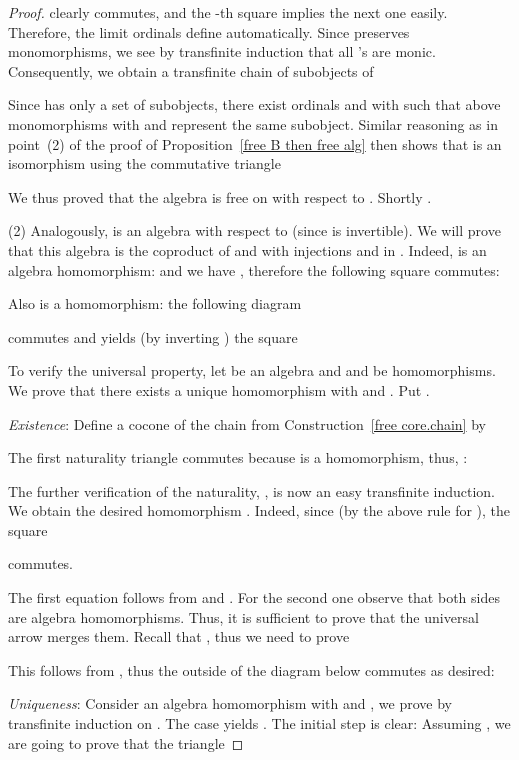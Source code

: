 \documentclass{LMCS}
\theoremstyle{plain}
\theoremstyle{definition}
\numberwithin{equation}{section}
\begin{document}
\begin{defi}
\begin{proof}
 clearly commutes, and the -th square implies the next one easily. Therefore, the limit ordinals  define  automatically. Since  preserves monomorphisms, we see by transfinite induction that all 's are monic. Consequently, we obtain a transfinite chain of subobjects of 
 
Since  has only a set of subobjects, there exist ordinals  and  with  such that above monomorphisms with  and  represent the same subobject. Similar reasoning as in point~(2) of the proof of Proposition~\ref{free B then free alg} then shows that  is an isomorphism using the commutative triangle

We thus proved that the algebra  is free on  with respect to . Shortly .

(2) Analogously,  is an algebra with respect to  (since  is invertible). We will prove that this algebra is the coproduct of  and  with injections  and 
in . Indeed,  is an algebra homomorphism:  and we have , therefore the following square commutes:


Also  is a homomorphism: the following diagram


commutes and yields (by inverting ) the square


To verify the universal property, let  be an algebra and  and  be homomorphisms. We prove that there exists a unique homomorphism  with  and . Put .

{\it Existence}: Define a cocone  of the chain from
Construction~\ref{free core.chain} by
 
The first naturality triangle commutes because  is a homomorphism, thus, :

The further verification of the naturality, , is now an easy transfinite induction. We obtain the desired homomorphism .
Indeed, since  (by the above rule for ), the square

commutes.

The first equation  follows
from  and . For the second one
 observe that
both sides are algebra homomorphisms. Thus, it is sufficient to prove
that the universal arrow  merges them. Recall that , thus we need to prove

This follows from , thus the outside of the diagram below commutes as desired:


{\it Uniqueness}: Consider an algebra homomorphism
 with  and
, we prove 
by transfinite induction on . The case  yields . The initial step is clear:
Assuming , we are going to prove that the triangle


\end{proof}
\end{defi}
\end{document}

